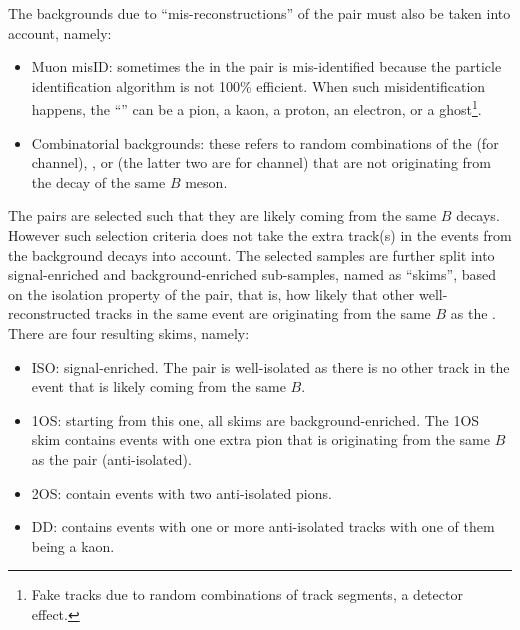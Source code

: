 The backgrounds due to ``mis-reconstructions'' of the \DXmu pair must
also be taken into account, namely:
\begin{itemize}
    \item Muon misID:
        sometimes the \muon in the \DXmu pair is mis-identified
        because the particle identification algorithm is not 100\% efficient.
        When such misidentification happens,
        the ``\muon'' can be a pion, a kaon, a proton, an electron,
        or a ghost\footnote{
            Fake tracks due to random combinations of track segments, a detector
            effect.
        }.
    \item Combinatorial backgrounds:
        these refers to random combinations of the \Dz \muon (for \Dz channel),
        \Dstar \muon, or \Dz \pion (the latter two are for \Dstar channel)
        that are not originating from the decay of the same $B$ meson.
\end{itemize}


The \DXmu pairs are selected such that they are likely coming from
the same $B$ decays.
However such selection criteria does not take the extra track(s) in the events
from the background decays into account.
The selected \DXmu samples are further split into signal-enriched and
background-enriched sub-samples, named as ``skims'',
based on the isolation property of the \DXmu pair,
that is, how likely that other well-reconstructed tracks in the same event
are originating from the same $B$ as the \DXmu.
There are four resulting skims, namely:
\begin{itemize}
    \item ISO: signal-enriched. The \DXmu pair is well-isolated as there
        is no other track in the event that is likely coming from the same $B$.
    \item 1OS: starting from this one, all skims are background-enriched.
        The 1OS skim contains events with one extra pion that is originating
        from the same $B$ as the \DXmu pair
        (anti-isolated).
    \item 2OS: contain events with two anti-isolated pions.
    \item DD: contains events with one or more anti-isolated tracks with one
        of them being a kaon.
\end{itemize}



